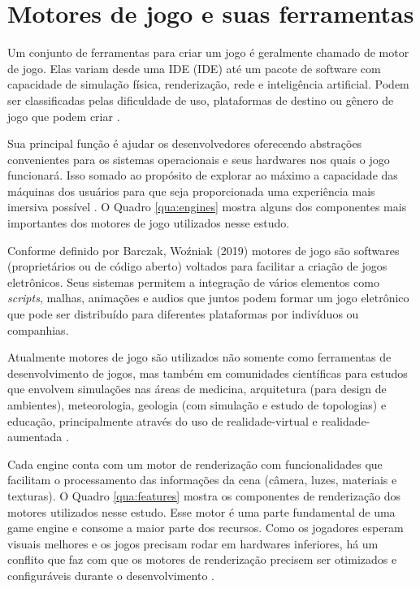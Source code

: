 \section{Motores de jogo e suas ferramentas}
\label{sec:motores-jogo-ferramentas}

Um conjunto de ferramentas para criar um jogo é geralmente chamado de motor de jogo. Elas variam desde uma IDE (\acrlong{IDE}) até um pacote de software com capacidade de simulação física, renderização, rede e inteligência artificial. Podem ser classificadas pelas dificuldade de uso, plataformas de destino ou gênero de jogo que podem criar \cite{compGameLang}. 

Sua principal função é ajudar os desenvolvedores oferecendo abstrações convenientes para os sistemas operacionais e seus hardwares nos quais o jogo funcionará. Isso somado ao propósito de explorar ao máximo a capacidade das máquinas dos usuários para que seja proporcionada uma experiência mais imersiva possível \cite{simon2015unity}. O Quadro \ref{qua:engines} mostra alguns dos componentes mais importantes dos motores de jogo utilizados nesse estudo.



Conforme definido por Barczak, Woźniak (2019) motores de jogo são softwares (proprietários ou de código aberto) voltados para facilitar a criação de jogos eletrônicos. Seus sistemas permitem a integração de vários elementos como \textit{\Gls{scripts}}, malhas, animações e audios que juntos podem formar um jogo eletrônico que pode ser distribuído para diferentes plataformas por indivíduos ou companhias. 

Atualmente motores de jogo são utilizados não somente como ferramentas de desenvolvimento de jogos, mas também em comunidades científicas para estudos que envolvem simulações nas áreas de medicina, arquitetura (para design de ambientes), meteorologia, geologia (com simulação e estudo de topologias) e educação, principalmente através do uso de \Gls{realidade-virtual} e \Gls{realidade-aumentada} \cite{comparacaoDesempenho2}. 

Cada engine conta com um motor de renderização com funcionalidades que facilitam o processamento das informações da cena (câmera, luzes, materiais e texturas). O Quadro \ref{qua:features} mostra os componentes de renderização dos motores utilizados nesse estudo. Esse motor é uma parte fundamental de uma game engine e consome a maior parte dos recursos. Como os jogadores esperam visuais melhores e os jogos precisam rodar em hardwares inferiores, há um conflito que faz com que os motores de renderização precisem ser otimizados e configuráveis durante o desenvolvimento \cite{vsmid2017comparison}.


